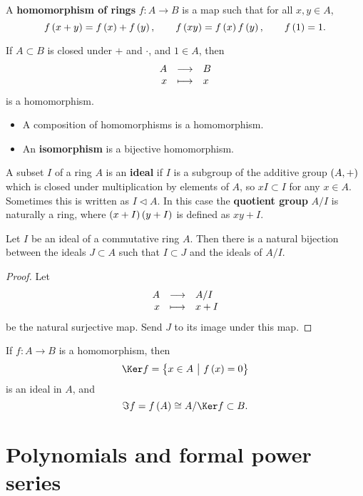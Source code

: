 \begin{definition}
A \textbf{homomorphism of rings} $ f : A \to B $ is a map such that for all $ x, y \in A $,
$$ f\br{x + y} = f\br{x} + f\br{y}, \qquad f\br{xy} = f\br{x}f\br{y}, \qquad f\br{1} = 1. $$
\end{definition}

\begin{example*}
If $ A \subset B $ is closed under $ + $ and $ \cdot $, and $ 1 \in A $, then
$$ \function{A}{B}{x}{x} $$
is a homomorphism.
\end{example*}

\begin{remark}
\hfill
\begin{itemize}
\item A composition of homomorphisms is a homomorphism.
\item An \textbf{isomorphism} is a bijective homomorphism.
\end{itemize}
\end{remark}

\begin{definition}
A subset $ I $ of a ring $ A $ is an \textbf{ideal} if $ I $ is a subgroup of the additive group $ \br{A, +} $ which is closed under multiplication by elements of $ A $, so $ xI \subset I $ for any $ x \in A $. Sometimes this is written as $ I \triangleleft A $. In this case the \textbf{quotient group} $ A / I $ is naturally a ring, where $ \br{x + I}\br{y + I} $ is defined as $ xy + I $.
\end{definition}

\begin{proposition}
Let $ I $ be an ideal of a commutative ring $ A $. Then there is a natural bijection between the ideals $ J \subset A $ such that $ I \subset J $ and the ideals of $ A / I $.
\end{proposition}

\begin{proof}
Let
$$ \function{A}{A / I}{x}{x + I} $$
be the natural surjective map. Send $ J $ to its image under this map.
\end{proof}

\begin{definition}
If $ f : A \to B $ is a homomorphism, then
$$ \Ker f = \cbr{x \in A \st f\br{x} = 0} $$
is an ideal in $ A $, and
$$ \Im f = f\br{A} \cong A / \Ker f \subset B. $$
\end{definition}

\pagebreak

\section{Polynomials and formal power series}

